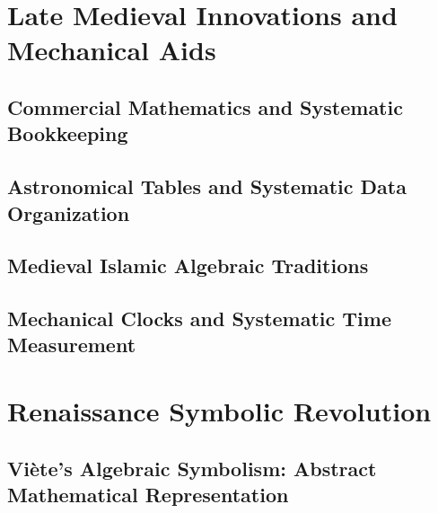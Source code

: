 \documentclass[12pt, oneside, openany]{book}
\let\oldchapter\chapter
\renewcommand{\chapter}{
	\cleardoublepage
	\thispagestyle{chapter}
	\oldchapter
}
\begin{document}
\chapter{Late Medieval Innovations and Mechanical Aids}

\section{Commercial Mathematics and Systematic Bookkeeping}

\section{Astronomical Tables and Systematic Data Organization}

\section{Medieval Islamic Algebraic Traditions}

\section{Mechanical Clocks and Systematic Time Measurement}


\chapter{Renaissance Symbolic Revolution}

\section{Viète's Algebraic Symbolism: Abstract Mathematical Representation}
\end{document}
